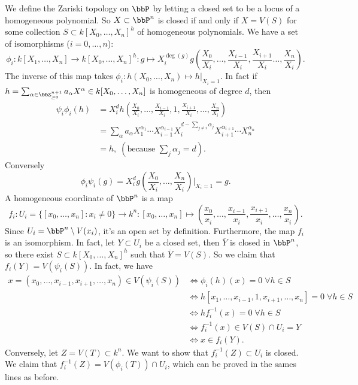We define the Zariski topology on $\bbP$ by letting a closed set to be a locus of a homogeneous polynomial. So 
$X\subset \bbP^n$ is closed if and only if $X=V(S)$ for some collection $S\subset k[X_0,\dots,X_n]^h$ of homogeneous polynomials. 
We have a set of isomorphisms ($i=0,\dots,n$):
\begin{equation}
  \phi_i:  k[X_1,\dots,X_n]\rightarrow k[X_0,\dots, X_n]^h: g\mapsto
   X_i^{\deg(g)}g(\frac{X_0}{X_i},\dots,\frac{X_{i-1}}{X_i},\frac{X_{i+1}}{X_i}\dots,\frac{X_n}{X_i}).
\end{equation}
The inverse of this map takes $\phi_i:h(X_0,\dots, X_n)\mapsto h|_{X_i=1}$. In fact 
if $h=\sum_{\alpha\in\bbZ_{\geq0}^{n+1}}a_\alpha X^\alpha\in k[X_0,\dots, X_n]$ is homogeneous of degree $d$, then
\begin{equation}
    \begin{split}
        \psi_i\phi_i(h)&=X_i^dh(\frac{X_0}{X_i},\dots,\frac{X_{i-1}}{X_i},1,\frac{X_{i+1}}{X_i},\dots,\frac{X_n}{X_i})\\
        &=\sum_\alpha a_\alpha X_1^{\alpha_1}\cdots X_{i-1}^{\alpha_{i-1}} X_i^{d-\sum_{j\neq i}\alpha_j}
        X_{i+1}^{\alpha_{i+1}}\cdots X_n^{\alpha_n}\\
        &=h,\;(\text{because }\sum_j\alpha_j=d).
    \end{split}
\end{equation} 
Conversely 
\begin{equation}
        \phi_i\psi_i(g) = X_i^dg(\frac{X_0}{X_i},\dots,\frac{X_n}{X_i})\bigg|_{X_i=1}=g.
\end{equation}
A homogeneous coordinate of $\bbP^n$ is a map 
\begin{equation}
    f_i: U_i=\{[x_0,\dots,x_n]:x_i\neq0\}\rightarrow k^n:[x_0,\dots, x_n]\mapsto 
    (\frac{x_0}{x_i},\dots, \frac{x_{i-1}}{x_i},\frac{x_{i+1}}{x_i},\dots, \frac{x_n}{x_i}).
\end{equation}
Since $U_i = \bbP^n\setminus V(x_i)$, it's an open set by definition. Furthermore, the map $f_i$ is an 
isomorphism. In fact, let $Y\subset U_i$ be a closed set, then $\overline{Y}$ is closed in $\bbP^n$, so there exist 
$S\subset k[X_0,\dots, X_n]^h$ such that $\overline{Y}=V(S)$. So we claim that $f_i(Y)=V(\psi_i(S))$. In fact, we have 
\begin{equation}
    \begin{split}
        x=(x_0,\dots,x_{i-1},x_{i+1},\dots,x_n)\in V(\psi_i(S)) &\iff \phi_i(h)(x) = 0\;\forall h\in S\\
        &\iff h[x_1,\dots,x_{i-1},1,x_{i+1},\dots, x_n]=0\;\forall h\in S\\
        &\iff hf_i^{-1}(x)=0\;\forall h\in S\\
        &\iff f_i^{-1}(x)\in V(S)\cap U_i = Y\\
        &\iff x\in f_i(Y).
    \end{split}
\end{equation}
Conversely, let $Z=V(T)\subset k^n$. We want to show that $f_i^{-1}(Z)\subset U_i$ is closed. We claim 
that $f_i^{-1}(Z)=V(\phi_i(T))\cap U_i$, which can be proved in the sames lines as before.\par 

